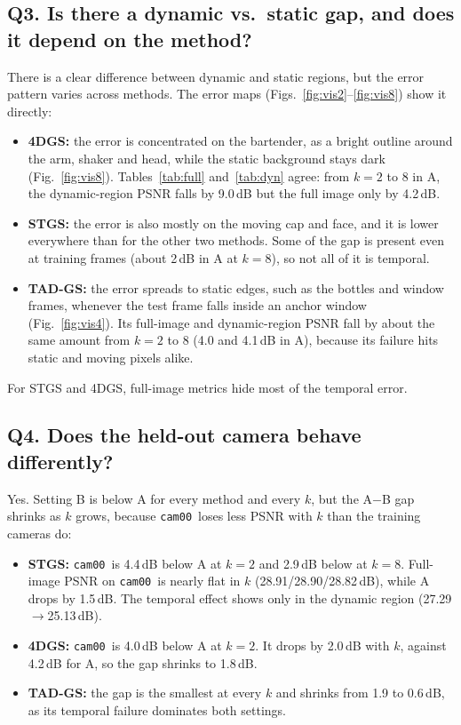 \documentclass[10pt,a4paper]{article}
\newcommand{\camz}{\texttt{cam00}}
\begin{document}
\subsection*{Q3. Is there a dynamic vs.\ static gap, and does it depend on the method?}
There is a clear difference between dynamic and static regions, but the error pattern varies across methods. The error maps (Figs.~\ref{fig:vis2}--\ref{fig:vis8}) show it directly:
\begin{itemize}
\item \textbf{4DGS:} the error is concentrated on the bartender, as a bright outline around the arm, shaker and head, while the static background stays dark (Fig.~\ref{fig:vis8}). Tables~\ref{tab:full} and~\ref{tab:dyn} agree: from $k=2$ to 8 in A, the dynamic-region PSNR falls by 9.0\,dB but the full image only by 4.2\,dB.
\item \textbf{STGS:} the error is also mostly on the moving cap and face, and it is lower everywhere than for the other two methods. Some of the gap is present even at training frames (about 2\,dB in A at $k=8$), so not all of it is temporal.
\item \textbf{TAD-GS:} the error spreads to static edges, such as the bottles and window frames, whenever the test frame falls inside an anchor window (Fig.~\ref{fig:vis4}). Its full-image and dynamic-region PSNR fall by about the same amount from $k=2$ to 8 (4.0 and 4.1\,dB in A), because its failure hits static and moving pixels alike.
\end{itemize}
For STGS and 4DGS, full-image metrics hide most of the temporal error.

\subsection*{Q4. Does the held-out camera behave differently?}
Yes. Setting B is below A for every method and every $k$, but the A$-$B gap shrinks as $k$ grows, because \camz\ loses less PSNR with $k$ than the training cameras do:
\begin{itemize}
\item \textbf{STGS:} \camz\ is 4.4\,dB below A at $k=2$ and 2.9\,dB below at $k=8$. Full-image PSNR on \camz\ is nearly flat in $k$ (28.91/28.90/28.82\,dB), while A drops by 1.5\,dB. The temporal effect shows only in the dynamic region (27.29$\to$25.13\,dB).
\item \textbf{4DGS:} \camz\ is 4.0\,dB below A at $k=2$. It drops by 2.0\,dB with $k$, against 4.2\,dB for A, so the gap shrinks to 1.8\,dB.
\item \textbf{TAD-GS:} the gap is the smallest at every $k$ and shrinks from 1.9 to 0.6\,dB, as its temporal failure dominates both settings.
\end{itemize}
\end{document}
